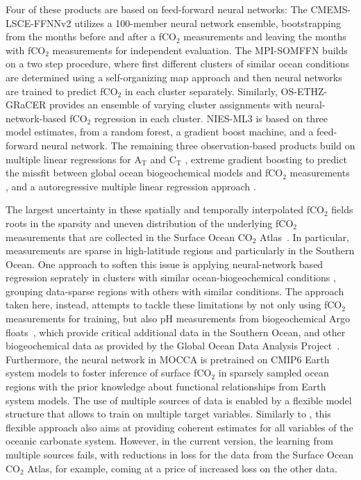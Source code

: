 \documentclass{article}
\begin{document}
	Four of these products are based on feed-forward neural networks: The CMEMS-LSCE-FFNNv2 \citep{chau2022} utilizes a 100-member neural network ensemble,  bootstrapping from the months before and after a fCO$_2$ measurements and leaving the months with fCO$_2$ measurements for independent evaluation. The MPI-SOMFFN \citep{landschuetzer2016} builds on a two step procedure, where first different clusters of similar ocean conditions are determined using a self-organizing map approach and then neural networks are trained to predict fCO$_2$ in each cluster separately. Similarly, OS-ETHZ-GRaCER \citep{gregor2021} provides an ensemble of varying cluster assignments with neural-network-based fCO$_2$ regression in each cluster. NIES-ML3 \citep{zeng2022} is based on three model estimates, from a random forest, a gradient boost machine, and a feed-forward neural network. The remaining three observation-based products build on multiple linear regressions for A$_\text{T}$ and C$_\text{T}$ \citep[fundamental variables to calculate fCO$_2$ and other carbonate system variables; JMA-MLR;][]{iida2021}, extreme gradient boosting to predict the missfit between global ocean biogeochemical models and fCO$_2$ measurements \citep[LDEO-HPD;][]{gloege2022}, and a autoregressive multiple linear regression approach \citep[Jena-MLS;][]{roedenbeck2022}.
	
	The largest uncertainty in these spatially and temporally interpolated fCO$_2$ fields roots in the sparsity and uneven distribution of the underlying fCO$_2$ measurements that are collected in the Surface Ocean CO$_2$ Atlas~\citep{bakker2016}. In particular, measurements are sparse in high-latitude regions and particularly in the Southern Ocean. One approach to soften this issue is applying neural-network based regression seprately in clusters with similar ocean-biogeochemical conditions \citep{landschuetzer2016,gregor2021}, grouping data-sparse regions with others with similar conditions. The approach taken here, instead, attempts to tackle these limitations by not only using fCO$_2$ measurements for training, but also pH measurements from biogeochemical Argo floats~\citep{johnson2017}, which provide critical additional data in the Southern Ocean, and other biogeochemical data as provided by the Global Ocean Data Analysis Project~\citep[GLODAPv2;][]{olsen2016}. Furthermore, the neural network in MOCCA is pretrained on CMIP6 Earth system models to foster inference of surface fCO$_2$ in sparsely sampled ocean regions with the prior knowledge about functional relationships from Earth system models. The use of multiple sources of data is enabled by a flexible model structure that allows to train on multiple target variables. Similarly to \cite{iida2021}, this flexible approach also aims at providing coherent estimates for all variables of the oceanic carbonate system. However, in the current version, the learning from multiple sources fails, with reductions in loss for the data from the Surface Ocean CO$_2$ Atlas, for example, coming at a price of increased loss on the other data.
	
\end{document}
